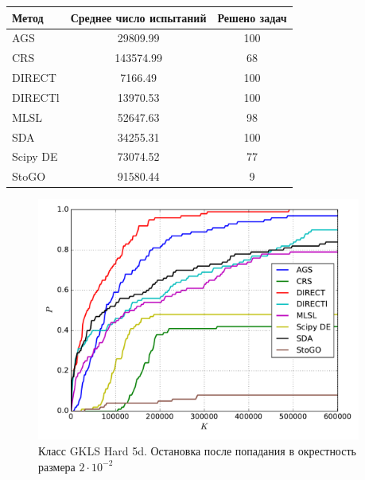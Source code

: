 \documentclass[a4paper]{article}
\begin{document}
\begin{tabular}{lcc}
\hline
 Метод    &  Среднее число испытаний  &  Решено задач  \\
\hline
 AGS      &         29809.99          &      100       \\
 CRS      &         143574.99         &       68       \\
 DIRECT   &          7166.49          &      100       \\
 DIRECTl  &         13970.53          &      100       \\
 MLSL     &         52647.63          &       98       \\
 SDA      &         34255.31          &      100       \\
 Scipy DE &         73074.52          &       77       \\
 StoGO    &         91580.44          &       9        \\
\hline
\end{tabular}
\begin{figure}[H]
  \center
  \includegraphics[width=0.95\textwidth]{../experiments/gklsh5d/cmc.pdf}
  \caption{Класс GKLS Hard 5d. Остановка после попадания в окрестность размера $2\cdot10^{-2}$}
  \label{fig:}
\end{figure}
\end{document}
